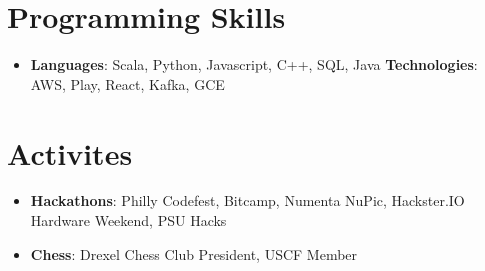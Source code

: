 \documentclass[letterpaper,11pt]{article}
\newcommand{\resumeItem}[2]{
  \item\small{
    \textbf{#1}{: #2 \vspace{-2pt}}
  }
}
\newcommand{\resumeSubItem}[2]{\resumeItem{#1}{#2}\vspace{-4pt}}
\newcommand{\resumeSubHeadingListStart}{\begin{itemize}[leftmargin=*]}
\newcommand{\resumeSubHeadingListEnd}{\end{itemize}}
\begin{document}
\section{Programming Skills}
 \resumeSubHeadingListStart
   \item{
     \textbf{Languages}{: Scala, Python, Javascript, C++, SQL, Java}
     \hfill
     \textbf{Technologies}{: AWS, Play, React, Kafka, GCE}
   }
 \resumeSubHeadingListEnd

 \section{Activites}
  \resumeSubHeadingListStart
    \resumeSubItem{Hackathons}
      {Philly Codefest, Bitcamp, Numenta NuPic, Hackster.IO Hardware Weekend, PSU Hacks}
    \resumeSubItem{Chess}
      {Drexel Chess Club President, USCF Member}
  \resumeSubHeadingListEnd


\end{document}
